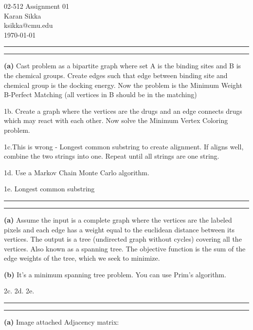 \documentclass[11pt,letterpaper]{article}
\makeatletter
\newcommand{\question}[1] {\vspace{.25in} \hrule\vspace{0.5em}
\noindent{\bf #1} \vspace{0.5em}
\hrule \vspace{.10in}}
\renewcommand{\part}[1] {\vspace{.10in} {\bf (#1)}}
\newcommand{\myname}{Karan Sikka}
\newcommand{\myandrew}{ksikka@cmu.edu}
\newcommand{\myhwnum}{01}
\makeatother
\begin{document}
\medskip

\thispagestyle{plain}
\begin{center}                  %
{\Large 02-512 Assignment \myhwnum} \\
\myname \\
\myandrew \\
\today
\end{center}

\question{1}
\part{a}
Cast problem as a bipartite graph where set A is the binding sites and B is the chemical groups.
Create edges such that edge between binding site and chemical group is the docking energy.
Now the problem is the Minimum Weight B-Perfect Matching (all vertices in B should be in the matching)

1b. Create a graph where the vertices are the drugs and an edge connects drugs which may react with each other.
Now solve the Minimum Vertex Coloring problem.

1c.This is wrong - Longest common substring to create alignment. If aligns well, combine the two strings into one. Repeat until all strings are one string.

1d. Use a Markov Chain Monte Carlo algorithm. 

1e. Longest common substring


\question{2}
\part{a}
Assume the input is a complete graph where the vertices are the labeled pixels and each edge has a weight equal to the euclidean distance between its vertices.
The output is a tree (undirected graph without cycles) covering all the vertices. Also known as a spanning tree.
The objective function is the sum of the edge weights of the tree, which we seek to minimize.

\part{b}
It's a minimum spanning tree problem. You can use Prim's algorithm.

2c. 
2d. 
2e. 

\question{3}
\part{a}
Image attached
Adjacency matrix:
\end{document}
